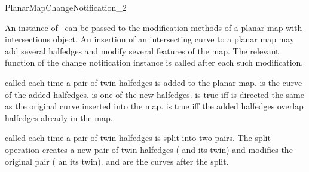 
\ccRefPageBegin

\begin{ccRefConcept}{PlanarMapChangeNotification_2}

\ccDefinition
   An instance of \ccRefName\ can be passed to the modification
   methods of a planar map with intersections object. An insertion
   of an intersecting curve to a planar map may add several
   halfedges and modify several features of the map. The relevant
   function of the change notification instance is called after
   each such modification.

\ccTypes
{}

\ccOperations


  {called each time a pair of twin halfedges is added to the planar map.
   is the curve of the added halfedges.
   is one of the new halfedges.
   is true iff  is directed the same as the
  original curve inserted into the map.
   is true iff the added halfedges overlap halfedges already in the
  map.}

  {called each time a pair of twin halfedges is split into two
  pairs. The split operation creates a new pair of twin halfedges
  ( and its twin) and modifies the original
  pair ( an its twin).
   and  are the curves after the split.
  }


\end{ccRefConcept}

